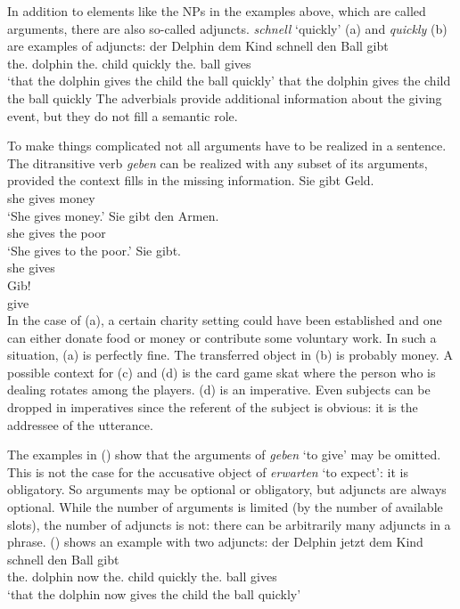 In addition to elements like the NPs in the examples above, which are called arguments,
there are also so-called adjuncts. \emph{schnell} `quickly' (a) and \emph{quickly} (b)
are examples of adjuncts:
\eal
\ex
\gll \dass{} der        Delphin dem        Kind  schnell den        Ball gibt\\
     \that{} the.\NOM{} dolphin the.\DAT{} child quickly the.\ACC{} ball gives\\
\glt `that the dolphin gives the child the ball quickly'
\ex that the dolphin gives the child the ball quickly
\zl
The adverbials provide additional information about the giving event, but they do not fill a
semantic role.

To make things complicated not all arguments have to be realized in a sentence. The ditransitive verb \emph{geben} can be
realized with any subset of its arguments, provided the context fills in the missing information.
\eal
\ex 
\gll Sie gibt Geld.\\
     she gives money\\
\glt `She gives money.'
\ex 
\gll Sie gibt den Armen.\\
     she gives the poor\\
\glt `She gives to the poor.'
\ex\label{ex-sie-gibt} 
\gll Sie gibt.\\
     she gives\\
\ex 
\gll Gib!\\
     give\\
\zl
\largerpage
In the case of (a), a certain charity setting could have been established and one can either
donate food or money or contribute some voluntary work. In such a situation, (a) is perfectly
fine. The transferred object in (b) is probably money. A possible context for (c) and
(d) is the card game skat where the person who is dealing rotates among the
players. (d) is an imperative. Even subjects can be dropped in imperatives since the referent
of the subject is obvious: it is the addressee of the utterance. 

The examples in () show that the arguments of \emph{geben} `to give' may be omitted. This is
not the case for the accusative object of \emph{erwarten} `to expect': it is obligatory. So
arguments may be optional or obligatory, but adjuncts are always optional. While the number of
arguments is limited (by the number of available slots), the number of adjuncts is not: there can be
arbitrarily many adjuncts in a phrase. () shows an example with two adjuncts:
\ea
\gll \dass{} der        Delphin jetzt dem        Kind  schnell den        Ball gibt\\
     \that{} the.\NOM{} dolphin now   the.\DAT{} child quickly the.\ACC{} ball gives\\
\glt `that the dolphin now gives the child the ball quickly'
\z


